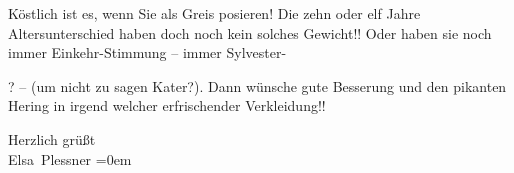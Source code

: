 \pstart
           Köstlich ist es, wenn Sie als Greis posieren! Die zehn oder elf Jahre
               Altersunterschied haben doch noch kein solches Gewicht!! Oder haben sie noch immer
               Einkehr-Stimmung – {\pb}immer Sylvester-\begin{otherlanguage}{french}\label{K_L03719-3v}\label{K_L03719-3}\end{otherlanguage}? – (um nicht zu sagen Kater?). Dann wünsche gute Besserung und
               den pikanten Hering in irgend welcher erfrischender Verkleidung!!\pend
           
\pstart
           Herzlich grüßt{\\[\baselineskip]}\spacefill\mbox{Elsa Plessner}\pend
           \leftskip=0em{}\endnumbering{}
\begin{anhang}
\end{anhang}
      